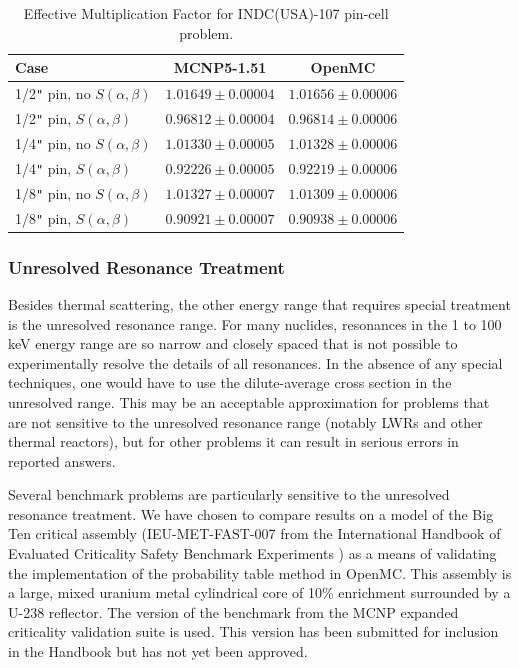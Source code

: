 \documentclass[authoryear,preprint]{elsarticle}
\begin{document}
\begin{table}
  \caption{Effective Multiplication Factor for INDC(USA)-107 pin-cell problem.}
  \label{tab:pincell}
  \begin{center}
  \begin{tabular}{ l c c }
    \hline
    Case & MCNP5-1.51 & OpenMC \\
    \hline
    1/2\verb+"+ pin, no $S(\alpha,\beta)$ & $1.01649 \pm 0.00004$ & $1.01656 \pm 0.00006$ \\
    1/2\verb+"+ pin, $S(\alpha,\beta)$    & $0.96812 \pm 0.00004$ & $0.96814 \pm 0.00006$ \\
    1/4\verb+"+ pin, no $S(\alpha,\beta)$ & $1.01330 \pm 0.00005$ & $1.01328 \pm 0.00006$ \\
    1/4\verb+"+ pin, $S(\alpha,\beta)$    & $0.92226 \pm 0.00005$ & $0.92219 \pm 0.00006$ \\
    1/8\verb+"+ pin, no $S(\alpha,\beta)$ & $1.01327 \pm 0.00007$ & $1.01309 \pm 0.00006$ \\
    1/8\verb+"+ pin, $S(\alpha,\beta)$    & $0.90921 \pm 0.00007$ & $0.90938 \pm 0.00006$ \\
    \hline
  \end{tabular}
  \end{center}
\end{table}

\subsubsection{Unresolved Resonance Treatment}

Besides thermal scattering, the other energy range that requires special
treatment is the unresolved resonance range. For many nuclides, resonances in
the 1 to 100 keV energy range are so narrow and closely spaced that is not
possible to experimentally resolve the details of all resonances. In the absence
of any special techniques, one would have to use the dilute-average
cross section in the unresolved range. This may be an acceptable approximation
for problems that are not sensitive to the unresolved resonance range (notably
LWRs and other thermal reactors), but for other problems it can result in
serious errors in reported answers.

Several benchmark problems are particularly sensitive to the unresolved
resonance treatment. We have chosen to compare results on a model of the Big Ten
critical assembly (IEU-MET-FAST-007 from the International Handbook of Evaluated
Criticality Safety Benchmark Experiments \citep{icsbep}) as a means of
validating the implementation of the probability table method in OpenMC. This
assembly is a large, mixed uranium metal cylindrical core of 10\% enrichment
surrounded by a U-238 reflector. The version of the benchmark from the MCNP
expanded criticality validation suite \citep{mcnp-validation} is used. This
version has been submitted for inclusion in the Handbook but has not yet been
approved.
\end{document}

